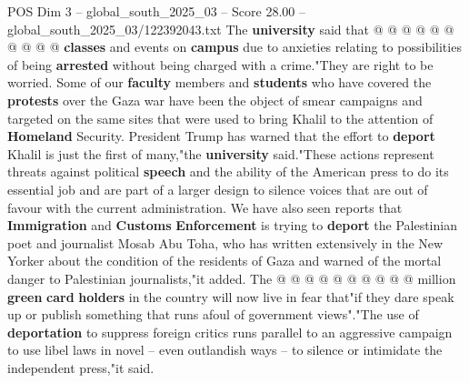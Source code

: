 \begin{textsample}{POS Dim 3 – global\_south\_2025\_03 – Score 28.00 – global\_south\_2025\_03/122392043.txt}
The \textbf{university} said that @ @ @ @ @ @ @ @ @ @ \textbf{classes} and events on \textbf{campus} due to anxieties relating to possibilities of being \textbf{arrested} without being charged with a crime."They are right to be worried.
Some of our \textbf{faculty} members and \textbf{students} who have covered the \textbf{protests} over the Gaza war have been the object of smear campaigns and targeted on the same sites that were used to bring Khalil to the attention of \textbf{Homeland} Security.
President Trump has warned that the effort to \textbf{deport} Khalil is just the first of many,"the \textbf{university} said."These actions represent threats against political \textbf{speech} and the ability of the American press to do its essential job and are part of a larger design to silence voices that are out of favour with the current administration.
We have also seen reports that \textbf{Immigration} and \textbf{Customs} \textbf{Enforcement} is trying to \textbf{deport} the Palestinian poet and journalist Mosab Abu Toha, who has written extensively in the New Yorker about the condition of the residents of Gaza and warned of the mortal danger to Palestinian journalists,"it added.
The @ @ @ @ @ @ @ @ @ @ million \textbf{green} \textbf{card} \textbf{holders} in the country will now live in fear that"if they dare speak up or publish something that runs afoul of government views"."The use of \textbf{deportation} to suppress foreign critics runs parallel to an aggressive campaign to use libel laws in novel -- even outlandish ways -- to silence or intimidate the independent press,"it said.

\end{textsample}
